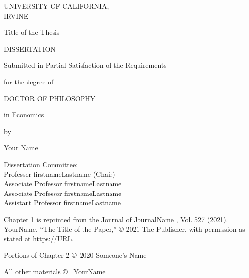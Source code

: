 \documentclass[letterpaper]{report}
\begin{document}
\pagestyle{cover}
{\makeatletter

\begin{center}

  \vspace*{1.72cm}
  UNIVERSITY OF CALIFORNIA,\\IRVINE
  
  \vspace*{1cm}
  Title of the Thesis
  
  \vspace*{0.25cm}
  DISSERTATION
  
  \vspace*{0.9cm}
  Submitted in Partial Satisfaction of the Requirements
  
  for the degree of
  
  \vspace*{0.73cm}
  DOCTOR OF PHILOSOPHY
  
  \vspace*{0.3cm}
  in Economics
  
  \vspace*{0.9cm}
  by
  
  \vspace*{0.9cm}
  Your Name
\end{center}

\vfill
\begin{flushright}
  Dissertation Committee:\\
  Professor firstnameLastname (Chair)\\
  Associate Professor firstnameLastname\\
  Associate Professor firstnameLastname\\
  Assistant Professor firstnameLastname
\end{flushright}

\vspace*{\fill}
\begin{center}
  \the\year{}
\end{center}}

\newpage
\pagestyle{copyright}
\vspace*{\fill}
\begin{center}
  Chapter 1 is reprinted from the Journal of JournalName , Vol. 527 (2021). YourName, ``The Title of the Paper,'' © 2021 The Publisher, with permission as stated at https://URL.
  
  Portions of Chapter 2 \copyright \ 2020 Someone's Name
  
  All other materials \copyright \ \the\year{} YourName
\end{center}
\end{document}

